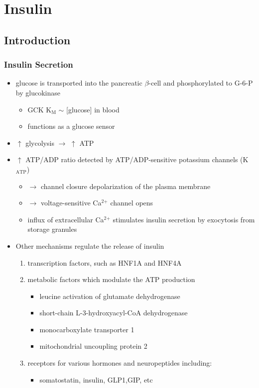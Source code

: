 \documentclass{scrartcl}
\begin{document}
\section{Insulin}
\label{sec:orge2e9435}
\subsection{Introduction}
\label{sec:orgcc33bfe}
\subsubsection{Insulin Secretion}
\label{sec:org01663c0}
\begin{itemize}
\item glucose is transported into the pancreatic \(\beta\)-cell and phosphorylated to G-6-P by glucokinase
\begin{itemize}
\item GCK K\(_{\text{M}}\) \(\sim\) [glucose] in blood
\item functions as a glucose sensor
\end{itemize}
\item \(\uparrow\) glycolysis \(\to\) \(\uparrow\) ATP
\item \(\uparrow\) ATP/ADP ratio detected by ATP/ADP-sensitive potassium channels (K\(_{\text{ATP}}\))
\begin{itemize}
\item \(\to\) channel closure depolarization of the plasma membrane
\item \(\to\) voltage-sensitive Ca\(^{\text{2+}}\) channel opens
\item influx of extracellular Ca\(^{\text{2+}}\) stimulates insulin secretion by
exocytosis from storage granules
\end{itemize}

\item Other mechanisms regulate the release of insulin
\begin{enumerate}
\item transcription factors, such as HNF1A and HNF4A
\item metabolic factors which modulate the ATP production
\begin{itemize}
\item leucine activation of glutamate dehydrogenase
\item short-chain L-3-hydroxyacyl-CoA dehydrogenase
\item monocarboxylate transporter 1
\item mitochondrial uncoupling protein 2
\end{itemize}
\item receptors for various hormones and neuropeptides including:
\begin{itemize}
\item somatostatin, insulin, GLP1,GIP, etc
\end{itemize}
\end{enumerate}
\end{itemize}
\end{document}
